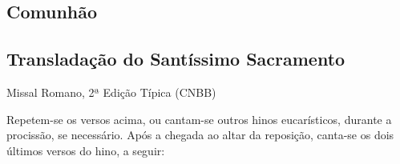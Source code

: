 \AllowPageFlush

\subsection{Comunhão}\label{subsection:hebdomada-sancta/missa-in-cena-domini/psalmi-ad-communionem}

\AllowPageFlush

\subsection{Transladação do Santíssimo Sacramento}\label{subsection:hebdomada-sancta/missa-in-cena-domini/hymnus-ad-translatione-ssmi-sacramenti}
\begin{annotation}
  Missal Romano, 2ª Edição Típica (CNBB)
\end{annotation}
\begin{rubrica}
  Repetem-se os versos acima, ou cantam-se outros hinos eucarísticos, durante a procissão, se necessário. Após a chegada ao altar da reposição, canta-se os dois últimos versos do hino, a seguir:
\end{rubrica}
